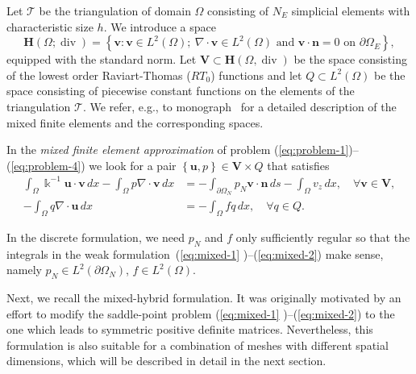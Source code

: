 Let $\mathcal{T}$ be the triangulation of domain $\Omega$ consisting of
$N_{E}$ simplicial elements with characteristic size $h$. We introduce a
space
\begin{equation}
\mathbf{H}(\Omega;\operatorname{div})=\left\{  \mathbf{v:v}\in L^{2}%
(\Omega);\ \nabla\cdot\mathbf{v}\in L^{2}(\Omega)\text{ and }\mathbf{v}%
\cdot\mathbf{n}=0\text{ on }\partial\Omega_{E}\right\}  ,
\end{equation}
equipped with the standard norm. Let $\mathbf{V}\subset\mathbf{H}%
(\Omega,\operatorname{div})$ be the space consisting of the lowest order
Raviart-Thomas ($RT_{0}$) functions and let $Q\subset L^{2}(\Omega)$ be the
space consisting of piecewise constant functions on the elements of the
triangulation $\mathcal{T}$. We refer, e.g., to 
monograph~\cite{Brezzi-1991-MHF} for a detailed description of the mixed
finite elements and the corresponding spaces.

In the \emph{mixed finite element approximation} of problem
(\ref{eq:problem-1})--(\ref{eq:problem-4}) we look for a pair $\left\{
\mathbf{u},p\right\}  \in\mathbf{V}\times Q$ that satisfies
\begin{align}
\int_{\Omega}\Bbbk^{-1}\mathbf{u}\cdot\mathbf{v}\,dx-\int_{\Omega}p\nabla
\cdot\mathbf{v}\,dx  &  =-\int_{\partial\Omega_{N}}p_{N}\mathbf{v}%
\cdot\mathbf{n}\,ds-\int_{\Omega}v_{z}\,dx,\quad\forall\mathbf{v}\in
\mathbf{V},\label{eq:mixed-1}\\
-\int_{\Omega}q\nabla\cdot\mathbf{u}\,dx  &  =-\int_{\Omega}fq\,dx,\quad
\forall q\in Q. \label{eq:mixed-2}%
\end{align}


In the discrete formulation, we need $p_{N}$ and $f$ only sufficiently regular
so that the integrals in the weak formulation~(\ref{eq:mixed-1}%
)--(\ref{eq:mixed-2}) make sense, namely $p_{N}\in L^{2}\left(  \partial
\Omega_{N}\right)  $, $f\in L^{2}\left(  \Omega\right)  $.

Next, we recall the mixed-hybrid formulation. It was originally motivated by
an effort to modify the saddle-point problem (\ref{eq:mixed-1}%
)--(\ref{eq:mixed-2}) to the one which leads to symmetric positive definite
matrices. Nevertheless, this formulation is also suitable for a combination of
meshes with different spatial dimensions, which will be described in detail in
the next section.

